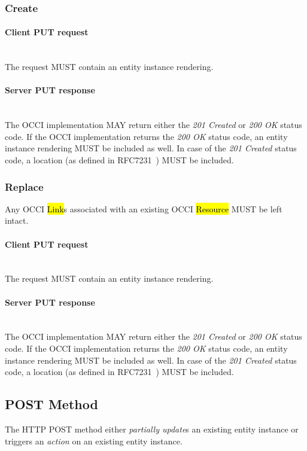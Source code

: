 \documentclass[10pt,a4paper]{article}
\begin{document}
\subsubsection{Create}

\paragraph*{Client PUT request}\hfill\\
The request MUST contain an entity instance rendering.

\paragraph*{Server PUT response}\hfill\\
The OCCI implementation MAY return either the \emph{201 Created} or \emph{200 OK} status code. If the OCCI implementation
returns the \emph{200 OK} status code, an entity instance rendering MUST be included as well.
In case of the \emph{201 Created} status code, a location (as defined in RFC7231~\cite{rfc7231}) MUST be included.

\subsubsection{Replace}
Any OCCI \hl{Link}s associated with an existing OCCI \hl{Resource} MUST be left intact.

\paragraph*{Client PUT request}\hfill\\
The request MUST contain an entity instance rendering.

\paragraph*{Server PUT response}\hfill\\
The OCCI implementation MAY return either the \emph{201 Created} or \emph{200 OK} status code. If the OCCI implementation
returns the \emph{200 OK} status code, an entity instance rendering MUST be included as well.
In case of the \emph{201 Created} status code, a location (as defined in RFC7231~\cite{rfc7231}) MUST be included.

\subsection{POST Method}
The HTTP POST method either {\em partially update}s an existing entity instance or triggers
an {\em action} on an existing entity instance.
\end{document}
